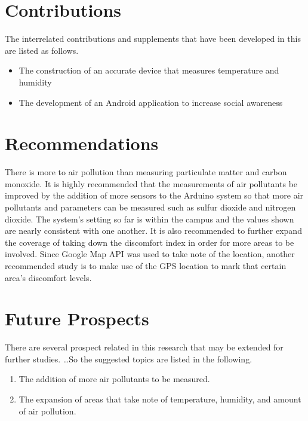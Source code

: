 \section{Contributions}

The interrelated  contributions and supplements that have been developed in this \documentType  are listed as follows.

\begin{itemize}
  \item The construction of an accurate device that measures temperature and humidity
	
	\item The development of an Android application to increase social awareness
  
	
\end{itemize}


\section{Recommendations}

There is more to air pollution than measuring particulate matter and carbon monoxide. It is highly recommended that the measurements of air pollutants be improved by the addition of more sensors to the Arduino system so that more air pollutants and parameters can be measured such as sulfur dioxide and nitrogen dioxide. The system's setting so far is within the campus and the values shown are nearly consistent with one another. It is also recommended to further expand the coverage of taking down the discomfort index in order for more areas to be involved. Since Google Map API was used to take note of the location, another recommended study is to make use of the GPS location to mark that certain area's discomfort levels.

\section{Future Prospects}

There are several prospect related in this research that may be extended for further studies. \ldots So the suggested topics are listed in the following.

\begin{enumerate}
	\item  The addition of more air pollutants to be measured.
	
	\item  The expansion of areas that take note of temperature, humidity, and amount of air pollution.
		
\end{enumerate}


